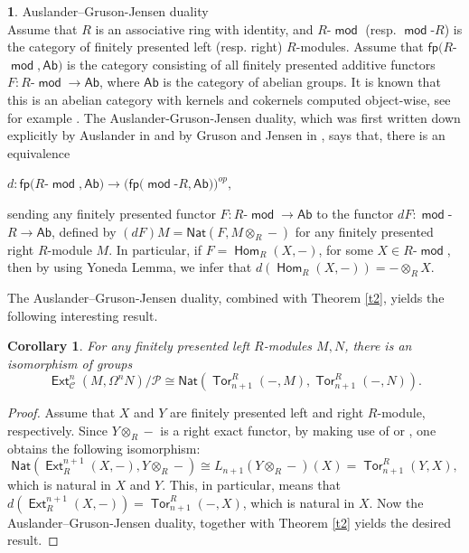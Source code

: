 \documentclass[11pt,a4paper]{amsart}
\newcommand{\rt}{\rightarrow}
\newcommand{\lrt}{\longrightarrow}
\newcommand{\C}{\mathscr{C} }
\newcommand{\p}{\mathfrak{p} }
\def\Ext{\operatorname{{\mathsf{Ext}}}}
\def\hom{\operatorname{{\mathsf{Hom}}}}
\def\Tor{\operatorname{\mathsf{Tor}}}
\def\hom{\operatorname{\mathsf{Hom}}}
\def\md{\operatorname{\mathsf{mod}}}
\def\syz{\mathsf{\Omega}}
\def\p{\mathcal P}
\newcommand{\nat}{{\mathsf{Nat}}}
\newtheorem{cor}[theorem]{Corollary}
\theoremstyle{definition}
\newtheorem{s}[theorem]{}
\theoremstyle{plain}
\theoremstyle{definition}
\numberwithin{equation}{section}
\begin{document}
\begin{s}{\sc Auslander--Gruson-Jensen duality}\\   Assume that $R$ is an associative ring with identity, and $R$-$\md$ (resp. $\md$-$R$) is the category of finitely presented left (resp. right) $R$-modules. Assume that ${\mathsf{fp}}(R$-$\md, \mathsf{Ab})$ is the category consisting of all finitely presented additive functors $F:R$-$\md\lrt\mathsf{Ab}$, where $\mathsf{Ab}$ is the category of abelian groups. It is known that this is an abelian category with kernels and cokernels computed object-wise, see for example \cite[Section 2]{aus}. The Auslander-Gruson-Jensen duality, which was first written down explicitly by Auslander in \cite{aus1} and by Gruson
and Jensen in \cite{gj}, says that, there is an equivalence
\begin{center}
$d: {\mathsf{fp}}(R$-$\md, \mathsf{Ab})\lrt ({\mathsf{fp}}(\md$-$R, \mathsf{Ab}))^{op},$
\end{center}
sending any finitely presented functor $F:R$-$\md\rt\mathsf{Ab}$ to the functor $dF:\md$-$R\rt\mathsf{Ab}$, defined by $(dF)M=\nat(F, M\otimes_R-)$ for any finitely presented right $R$-module $M$. In particular, if $F=\hom_R(X, -)$, for some $X\in R$-$\md$, then by using Yoneda Lemma, we infer that $d(\hom_R(X, -))=-\otimes_RX$.
\end{s}
The Auslander--Gruson-Jensen duality, combined with Theorem \ref{t2}, yields the following interesting result.
\begin{cor}\label{agj}For any  finitely presented left $R$-modules $M, N$, there is an isomorphism of groups
$$\Ext^n_{\C}(M, \syz^nN)/{\p}\cong\nat(\Tor_{n+1}^R(-, M), \Tor_{n+1}^R(-, N)).$$
\end{cor}
\begin{proof}
Assume that $X$ and $Y$ are finitely presented left and right $R$-module, respectively.  Since $Y\otimes_R-$ is a right exact functor, by making use of \cite[Theorem 1.2]{hr} or \cite[Corollary 5.4]{aus}, one obtains the following isomorphism: $$\nat(\Ext^{n+1}_R(X, -), Y\otimes_R-)\cong L_{n+1}(Y\otimes_R-)(X)=\Tor_{n+1}^R(Y, X),$$which is natural in $X$ and $Y$. This, in particular, means that $d(\Ext^{n+1}_R(X, -))=\Tor_{n+1}^R(-, X)$, which is natural in $X$. Now the Auslander--Gruson-Jensen duality, together with Theorem \ref{t2} yields the desired result.
\end{proof}
\end{document}
